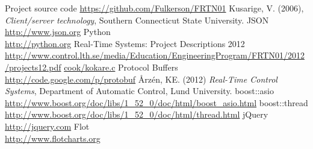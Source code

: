 \documentclass{article}
\begin{document}
\begin{thebibliography}{9}
Project source code
\url{https://github.com/Fulkerson/FRTN01}
Kusarige, V. (2006), \emph{Client/server technology}, Southern Connecticut State University.
JSON\\
\url{http://www.json.org}
Python\\
\url{http://python.org}
Real-Time Systems: Project Descriptions 2012\\
\url{http://www.control.lth.se/media/Education/EngineeringProgram/FRTN01/2012/projects12.pdf}
\url{cook/kokare.c}
Protocol Buffers\\
\url{http://code.google.com/p/protobuf}
Årzén, KE. (2012) \emph{Real-Time Control Systems}, Department of
Automatic Control, Lund University.
boost::asio\\
\url{http://www.boost.org/doc/libs/1_52_0/doc/html/boost_asio.html}
boost::thread\\
\url{http://www.boost.org/doc/libs/1_52_0/doc/html/thread.html}
jQuery\\
\url{http://jquery.com}
Flot\\
\url{http://www.flotcharts.org}
\end{thebibliography}
\end{document}
